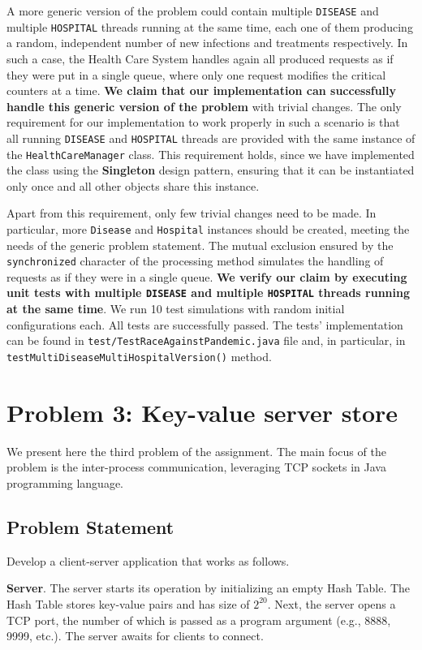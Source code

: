 \documentclass[acmlarge]{acmart}
\newcommand{\disease}{{\small \texttt{DISEASE}} }
\newcommand{\hospital}{{\small \texttt{HOSPITAL}} }
\begin{document}
A more generic version of the problem could contain multiple \disease and multiple \hospital threads running at the same time, each one of them producing a random, independent number of new infections and treatments respectively. In such a case, the Health Care System handles again all produced requests as if they were put in a single queue, where only one request modifies the critical counters at a time. \textbf{We claim that our implementation can successfully handle this generic version of the problem} with trivial changes. The only requirement for our implementation to work properly in such a scenario is that all running \disease and \hospital threads are provided with the same instance of the \texttt{HealthCareManager} class. This requirement holds, since we have implemented the class using the \textbf{Singleton} design pattern, ensuring that it can be instantiated only once and all other objects share this instance.

Apart from this requirement, only few trivial changes need to be made. In particular, more \texttt{Disease} and \texttt{Hospital} instances should be created, meeting the needs of the generic problem statement. The mutual exclusion ensured by the \texttt{synchronized} character of the processing method simulates the handling of requests as if they were in a single queue. \textbf{We verify our claim by executing unit tests with multiple \disease and multiple \hospital threads running at the same time}. We run 10 test simulations with random initial configurations each. All tests are successfully passed. The tests' implementation can be found in \texttt{test/TestRaceAgainstPandemic.java} file and, in particular, in \texttt{testMultiDiseaseMultiHospitalVersion()} method.


\section{Problem 3: Key-value server store}
\label{section:problem3}
We present here the third problem of the assignment. The main focus of the problem is the inter-process communication, leveraging TCP sockets in Java programming language.

\subsection{Problem Statement}
Develop a client-server application that works as follows.

\textbf{Server}. The server starts its operation by initializing an empty Hash Table. The Hash Table stores key-value pairs and has size of $2^{20}$. Next, the server opens a TCP port, the number of which is passed as a program argument (e.g., 8888, 9999, etc.). The server awaits for clients to connect.
\end{document}
